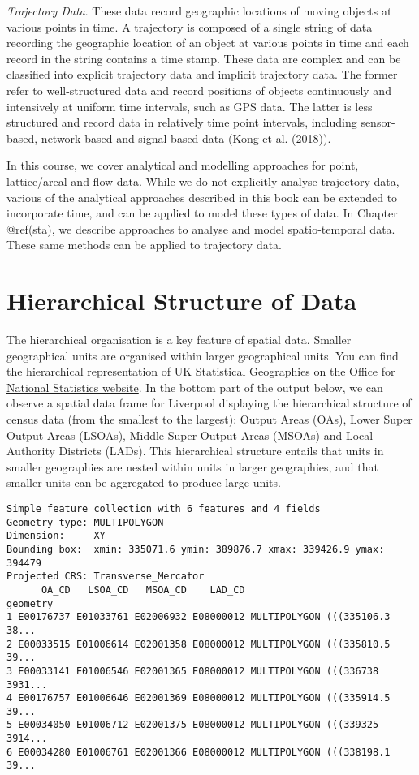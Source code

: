 \documentclass[
  letterpaper,
  krantz2]{style/krantz}
\begin{document}
\emph{Trajectory Data}. These data record geographic locations of moving
objects at various points in time. A trajectory is composed of a single
string of data recording the geographic location of an object at various
points in time and each record in the string contains a time stamp.
These data are complex and can be classified into explicit trajectory
data and implicit trajectory data. The former refer to well-structured
data and record positions of objects continuously and intensively at
uniform time intervals, such as GPS data. The latter is less structured
and record data in relatively time point intervals, including
sensor-based, network-based and signal-based data (Kong et al. (2018)).

In this course, we cover analytical and modelling approaches for point,
lattice/areal and flow data. While we do not explicitly analyse
trajectory data, various of the analytical approaches described in this
book can be extended to incorporate time, and can be applied to model
these types of data. In Chapter @ref(sta), we describe approaches to
analyse and model spatio-temporal data. These same methods can be
applied to trajectory data.

\hypertarget{hierarchical-structure-of-data}{%
\section{Hierarchical Structure of
Data}\label{hierarchical-structure-of-data}}

The hierarchical organisation is a key feature of spatial data. Smaller
geographical units are organised within larger geographical units. You
can find the hierarchical representation of UK Statistical Geographies
on the
\href{https://geoportal.statistics.gov.uk/search?collection=Document\&sort=name\&tags=all(DOC_HRSG\%2CDEC_2020)}{Office
for National Statistics website}. In the bottom part of the output
below, we can observe a spatial data frame for Liverpool displaying the
hierarchical structure of census data (from the smallest to the
largest): Output Areas (OAs), Lower Super Output Areas (LSOAs), Middle
Super Output Areas (MSOAs) and Local Authority Districts (LADs). This
hierarchical structure entails that units in smaller geographies are
nested within units in larger geographies, and that smaller units can be
aggregated to produce large units.

\begin{verbatim}
Simple feature collection with 6 features and 4 fields
Geometry type: MULTIPOLYGON
Dimension:     XY
Bounding box:  xmin: 335071.6 ymin: 389876.7 xmax: 339426.9 ymax: 394479
Projected CRS: Transverse_Mercator
      OA_CD   LSOA_CD   MSOA_CD    LAD_CD                       geometry
1 E00176737 E01033761 E02006932 E08000012 MULTIPOLYGON (((335106.3 38...
2 E00033515 E01006614 E02001358 E08000012 MULTIPOLYGON (((335810.5 39...
3 E00033141 E01006546 E02001365 E08000012 MULTIPOLYGON (((336738 3931...
4 E00176757 E01006646 E02001369 E08000012 MULTIPOLYGON (((335914.5 39...
5 E00034050 E01006712 E02001375 E08000012 MULTIPOLYGON (((339325 3914...
6 E00034280 E01006761 E02001366 E08000012 MULTIPOLYGON (((338198.1 39...
\end{verbatim}
\end{document}
